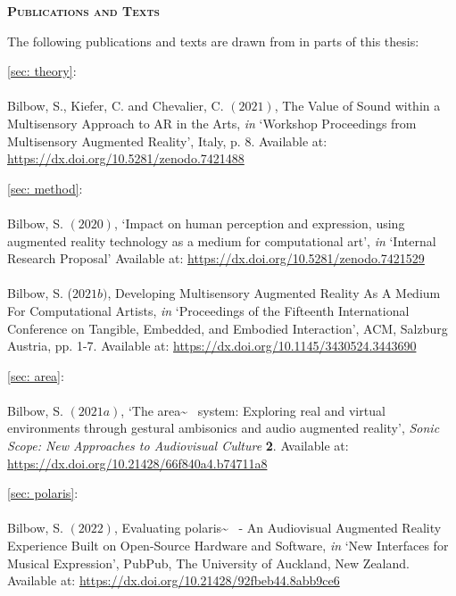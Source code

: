 \newpage
{}
\begin{flushleft}
	\Huge \textsc{\textbf{Publications and Texts}}

\end{flushleft}
\noindent The following publications and texts are drawn from in parts of this thesis:

\noindent\autoref{sec: theory}:  \\ \citep{bilbow2021} \\ Bilbow, S., Kiefer, C. and Chevalier, C. $(2021)$, The Value of Sound within a Multisensory Approach to AR in the Arts, \textit{in} `Workshop Proceedings from Multisensory Augmented Reality', Italy, p. 8. Available at: \url{https://dx.doi.org/10.5281/zenodo.7421488}
    
\vspace*{0.75cm}
\noindent\autoref{sec: method}:  \\ \citep{bilbow2020,bilbow2021b} \\ Bilbow, S. $(2020)$, `Impact on human perception and expression, using augmented reality technology as a medium for computational art', \textit{in} `Internal Research Proposal' Available at: \url{https://dx.doi.org/10.5281/zenodo.7421529} \\ \\ Bilbow, S. ($2021b)$, Developing Multisensory Augmented Reality As A Medium For Computational Artists, \textit{in} `Proceedings of the Fifteenth International Conference on Tangible, Embedded, and Embodied Interaction', ACM, Salzburg Austria, pp. 1-7. Available at: \url{https://dx.doi.org/10.1145/3430524.3443690}
    
\vspace*{0.75cm}
\noindent\autoref{sec: area}:  \\ \citep{bilbow2021a} \\ Bilbow, S. $(2021a)$, `The area\textasciitilde{}~ system: Exploring real and virtual environments through gestural ambisonics and audio augmented reality', \textit{Sonic Scope: New Approaches to Audiovisual Culture} \textbf{2}. Available at: \url{https://dx.doi.org/10.21428/66f840a4.b74711a8}
    
\vspace*{0.75cm}
\noindent\autoref{sec: polaris}:  \\ \citep{bilbow2022} \\ Bilbow, S. $(2022)$, Evaluating polaris\textasciitilde{}~ - An Audiovisual Augmented Reality Experience Built on Open-Source Hardware and Software, \textit{in} `New Interfaces for Musical Expression', PubPub, The University of Auckland, New Zealand. Available at: \url{https://dx.doi.org/10.21428/92fbeb44.8abb9ce6}